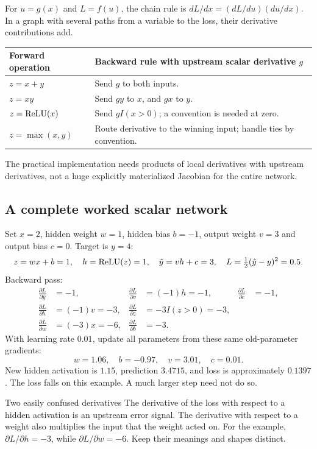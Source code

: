 \documentclass[11pt]{article}
\begin{document}
For $u=g(x)$ and $L=f(u)$, the chain rule is $dL/dx=(dL/du)(du/dx)$. In a graph with several paths from a variable to the loss, their derivative contributions add.
\begin{longtable}{@{}P{.31\textwidth}P{.60\textwidth}@{}}
\toprule Forward operation & Backward rule with upstream scalar derivative $g$\\\midrule\endhead
$z=x+y$ & Send $g$ to both inputs.\\
$z=xy$ & Send $gy$ to $x$, and $gx$ to $y$.\\
$z=\operatorname{ReLU}(x)$ & Send $gI(x>0)$; a convention is needed at zero.\\
$z=\max(x,y)$ & Route derivative to the winning input; handle ties by convention.\\\bottomrule
\end{longtable}
The practical implementation needs products of local derivatives with upstream derivatives, not a huge explicitly materialized Jacobian for the entire network.
\subsection{A complete worked scalar network}
Set $x=2$, hidden weight $w=1$, hidden bias $b=-1$, output weight $v=3$ and output bias $c=0$. Target is $y=4$:
\[
z=wx+b=1,\quad h=\operatorname{ReLU}(z)=1,\quad\hat y=vh+c=3,
\quad L=\tfrac12(\hat y-y)^2=0.5.
\]
Backward pass:
\begin{align*}
\frac{\partial L}{\partial\hat y}&=-1,&
\frac{\partial L}{\partial v}&=(-1)h=-1,&
\frac{\partial L}{\partial c}&=-1,\\
\frac{\partial L}{\partial h}&=(-1)v=-3,&
\frac{\partial L}{\partial z}&=-3I(z>0)=-3,\\
\frac{\partial L}{\partial w}&=(-3)x=-6,&
\frac{\partial L}{\partial b}&=-3.
\end{align*}
With learning rate $0.01$, update all parameters from these same old-parameter gradients:
\[
w=1.06,\quad b=-0.97,\quad v=3.01,\quad c=0.01.
\]
New hidden activation is $1.15$, prediction $3.4715$, and loss is approximately $0.1397$. The loss falls on this example. A much larger step need not do so.
\begin{careful}{Two easily confused derivatives}
The derivative of the loss with respect to a hidden activation is an upstream error signal. The derivative with respect to a weight also multiplies the input that the weight acted on. For the example, $\partial L/\partial h=-3$, while $\partial L/\partial w=-6$. Keep their meanings and shapes distinct.
\end{careful}
\end{document}
